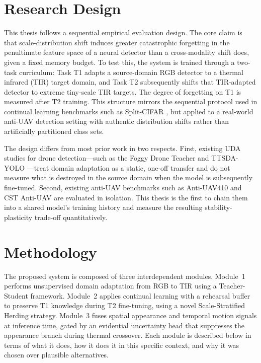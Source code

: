\documentclass[nolinenumbering]{thesisdesign}
\begin{document}
\maketitle

\section{Research Design}
\label{sec:research_design}

This thesis follows a sequential empirical evaluation design. The core claim is that scale-distribution shift induces greater catastrophic forgetting in the penultimate feature space of a neural detector than a cross-modality shift does, given a fixed memory budget. To test this, the system is trained through a two-task curriculum: Task T1 adapts a source-domain RGB detector to a thermal infrared (TIR) target domain, and Task T2 subsequently shifts that TIR-adapted detector to extreme tiny-scale TIR targets. The degree of forgetting on T1 is measured after T2 training. This structure mirrors the sequential protocol used in continual learning benchmarks such as Split-CIFAR \citep{rebuffi2017icarl}, but applied to a real-world anti-UAV detection setting with authentic distribution shifts rather than artificially partitioned class sets.

The design differs from most prior work in two respects. First, existing UDA studies for drone detection---such as the Foggy Drone Teacher \citep{zheng_foggy_2025} and TTSDA-YOLO \citep{zhang_ttsda-yolo_2025}---treat domain adaptation as a static, one-off transfer and do not measure what is destroyed in the source domain when the model is subsequently fine-tuned. Second, existing anti-UAV benchmarks such as Anti-UAV410 \citep{bohuang_410} and CST Anti-UAV \citep{xie2025cstantiuavthermalinfrared} are evaluated in isolation. This thesis is the first to chain them into a shared model's training history and measure the resulting stability-plasticity trade-off quantitatively.


\section{Methodology}
\label{sec:methodology}

The proposed system is composed of three interdependent modules. Module~1 performs unsupervised domain adaptation from RGB to TIR using a Teacher-Student framework. Module~2 applies continual learning with a rehearsal buffer to preserve T1 knowledge during T2 fine-tuning, using a novel Scale-Stratified Herding strategy. Module~3 fuses spatial appearance and temporal motion signals at inference time, gated by an evidential uncertainty head that suppresses the appearance branch during thermal crossover. Each module is described below in terms of what it does, how it does it in this specific context, and why it was chosen over plausible alternatives.
\end{document}
